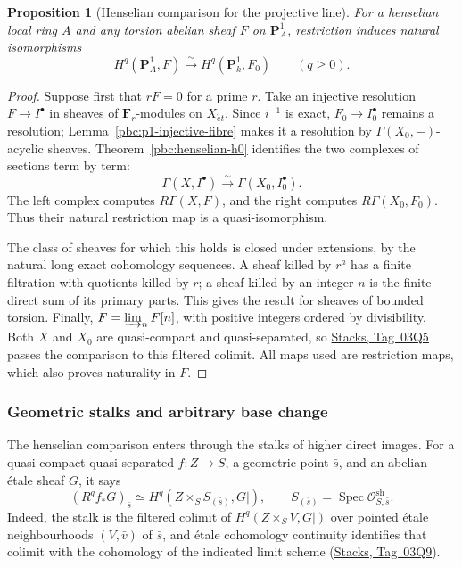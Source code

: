 \documentclass[11pt,a4paper]{article}
\numberwithin{equation}{section}
\newtheorem{proposition}[theorem]{Proposition}
\theoremstyle{definition}
\theoremstyle{remark}
\newcommand{\et}{\acute{e}t}
\newcommand{\stacks}[1]{\href{https://stacks.math.columbia.edu/tag/#1}{\textnormal{Stacks, Tag~#1}}}
\newcommand{\cO}{\mathcal O}
\newcommand{\PP}{\mathbf P}
\begin{document}
\begin{proposition}[Henselian comparison for the projective line]
\label{pbc:p1-henselian}
For a henselian local ring $A$ and any torsion abelian sheaf $F$ on
$\PP^1_A$, restriction induces natural isomorphisms
\[
 H^q(\PP^1_A,F)\xrightarrow{\sim}
 H^q(\PP^1_k,F_0)\qquad(q\geq0).
\]
\end{proposition}
\begin{proof}
Suppose first that $rF=0$ for a prime $r$.  Take an injective resolution
$F\to I^\bullet$ in sheaves of $\mathbf F_r$-modules on $X_{\et}$.
Since $i^{-1}$ is exact, $F_0\to I_0^\bullet$ remains a resolution;
Lemma~\ref{pbc:p1-injective-fibre} makes it a resolution by
$\Gamma(X_0,-)$-acyclic sheaves.  Theorem~\ref{pbc:henselian-h0}
identifies the two complexes of sections term by term:
\[
 \Gamma(X,I^\bullet)\xrightarrow{\sim}
 \Gamma(X_0,I_0^\bullet).
\]
The left complex computes $R\Gamma(X,F)$, and the right computes
$R\Gamma(X_0,F_0)$.  Thus their natural restriction map is a
quasi-isomorphism.

The class of sheaves for which this holds is closed under extensions,
by the natural long exact cohomology sequences.  A sheaf killed by
$r^a$ has a finite filtration with quotients killed by $r$; a sheaf
killed by an integer $n$ is the finite direct sum of its primary parts.
This gives the result for sheaves of bounded torsion.  Finally,
$F=\varinjlim_n F[n]$, with positive integers ordered by divisibility.
Both $X$ and $X_0$ are quasi-compact and quasi-separated, so
\stacks{03Q5} passes the comparison to this filtered colimit.  All maps
used are restriction maps, which also proves naturality in $F$.
\end{proof}

\subsubsection{Geometric stalks and arbitrary base change}

The henselian comparison enters through the stalks of higher direct
images. For a quasi-compact quasi-separated $f:Z\to S$, a geometric
point $\bar s$, and an abelian \'etale sheaf $G$, it says
\begin{equation}
 (R^qf_*G)_{\bar s}
 \simeq H^q(Z\times_SS_{(\bar s)},G|),\qquad
 S_{(\bar s)}=\operatorname{Spec}\cO^{\mathrm{sh}}_{S,\bar s}.
 \label{pbc:strict-local-stalk}
\end{equation}
Indeed, the stalk is the filtered
colimit of $H^q(Z\times_SV,G|)$ over pointed \'etale neighbourhoods
$(V,\bar v)$ of $\bar s$, and \'etale cohomology continuity identifies
that colimit with the cohomology of the indicated limit scheme
(\stacks{03Q9}).
\end{document}
